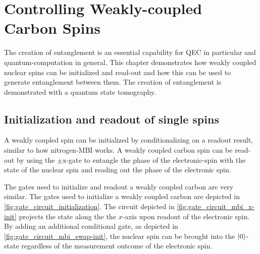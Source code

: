 \chapter{Controlling Weakly-coupled Carbon Spins}
The creation of entanglement is an essential capability for QEC in particular and quantum-computation in general.
This chapter demonstrates how weakly coupled nuclear spins can be initialized and read-out and how this can be used to generate entanglement between them.
The creation of entanglement is demonstrated with a quantum state tomography.

\section{Initialization and readout of single spins}
\label{sec:carbon_init_and_readout}
A weakly coupled spin can be initialized by conditionalizing on a readout result, similar to how nitrogen-MBI works.
A weakly coupled carbon spin can be read-out by using the $\pm \mathrm{x}$-gate to entangle the phase of the electronic-spin with the state of the nuclear spin and reading out the phase of the electronic spin.

The gates used to initialize and readout a weakly coupled carbon are very similar.
The gates used to initialize a weakly coupled carbon are depicted in \cref{fig:gate_circuit_initialization}.
The circuit depicted in \cref{fig:gate_circuit_mbi_x-init} projects the state along the the $x$-axis upon readout of the electronic spin.
By adding an additional conditional gate, as depicted in \cref{fig:gate_circuit_mbi_swap-init}, the nuclear spin can be brought into the ${\left\vert{0}\right\rangle}$-state regardless of the measurement outcome of the electronic spin.

